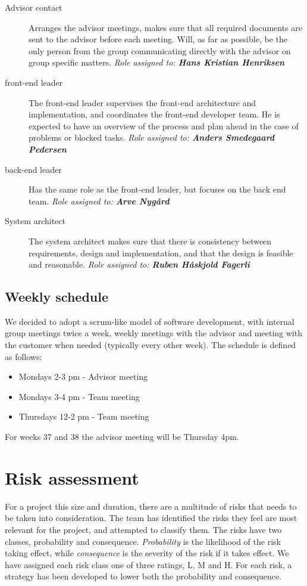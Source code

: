 \documentclass[11pt,a4paper,titlepage,oneside]{report}
\begin{document}
\begin{description}
\item[Advisor contact] Arranges the advisor meetings, makes sure that all required documents are sent to the advisor before each meeting. Will, as far as possible, be the only person from the group communicating directly with the advisor on group specific matters.
\emph{Role assigned to: \textbf{Hans Kristian Henriksen}}

\item[\Gls{front-end} leader] The \gls{front-end} leader supervises the \gls{front-end} architecture and implementation, and coordinates the \gls{front-end} developer team. He is expected to have an overview of the process and plan ahead in the case of problems or blocked tasks.
\emph{Role assigned to: \textbf{Anders Smedegaard Pedersen}}

\item[\Gls{back-end} leader] Has the same role as the \gls{front-end} leader, but focuses on the back end team.
\emph{Role assigned to: \textbf{Arve Nygård}}

\item[System architect] The system architect makes sure that there is consistency between requirements, design and implementation, and that the design is feasible and reasonable.
\emph{Role assigned to: \textbf{Ruben Håskjold Fagerli}}
\end{description}

\subsection{Weekly schedule}
We decided to adopt a scrum-like model of software development, with internal group meetings twice a week, weekly meetings with the advisor and meeting with the customer when needed (typically every other week). The schedule is defined as follows:
\begin{itemize}
\item Mondays 2-3 pm - Advisor meeting
\item Mondays 3-4 pm - Team meeting
\item Thursdays 12-2 pm - Team meeting
\end{itemize}
For weeks 37 and 38 the advisor meeting will be Thursday 4pm.

\section{Risk assessment}
For a project this size and duration, there are a multitude of risks that needs to be taken into consideration. The team has identified the risks they feel are most relevant for the project, and attempted to classify them. The risks have two classes, probability and consequence. \textit{Probability} is the likelihood of the risk taking effect, while \textit{consequence} is the severity of the risk if it takes effect. We have assigned each risk class one of three ratings, \gls{L}, \gls{M} and \gls{H}. For each risk, a strategy has been developed to lower both the probability and consequence. 
\end{document}
